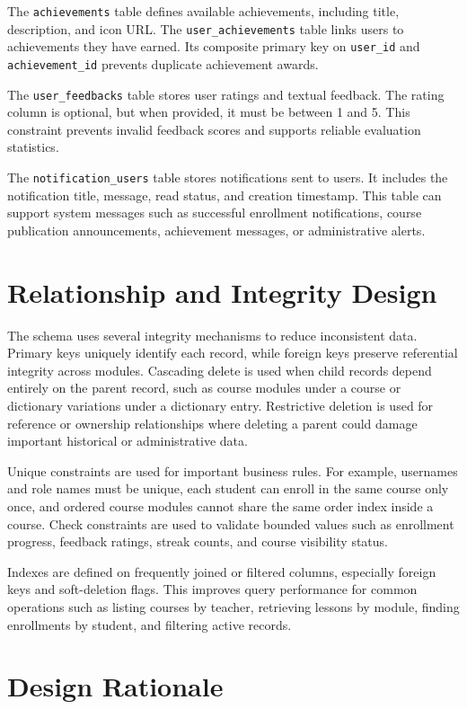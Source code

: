 The \texttt{achievements} table defines available achievements, including title, description, and icon URL. The \texttt{user\_achievements} table links users to achievements they have earned. Its composite primary key on \texttt{user\_id} and \texttt{achievement\_id} prevents duplicate achievement awards.

The \texttt{user\_feedbacks} table stores user ratings and textual feedback. The rating column is optional, but when provided, it must be between 1 and 5. This constraint prevents invalid feedback scores and supports reliable evaluation statistics.

The \texttt{notification\_users} table stores notifications sent to users. It includes the notification title, message, read status, and creation timestamp. This table can support system messages such as successful enrollment notifications, course publication announcements, achievement messages, or administrative alerts.

\section{Relationship and Integrity Design}

The schema uses several integrity mechanisms to reduce inconsistent data. Primary keys uniquely identify each record, while foreign keys preserve referential integrity across modules. Cascading delete is used when child records depend entirely on the parent record, such as course modules under a course or dictionary variations under a dictionary entry. Restrictive deletion is used for reference or ownership relationships where deleting a parent could damage important historical or administrative data.

Unique constraints are used for important business rules. For example, usernames and role names must be unique, each student can enroll in the same course only once, and ordered course modules cannot share the same order index inside a course. Check constraints are used to validate bounded values such as enrollment progress, feedback ratings, streak counts, and course visibility status.

Indexes are defined on frequently joined or filtered columns, especially foreign keys and soft-deletion flags. This improves query performance for common operations such as listing courses by teacher, retrieving lessons by module, finding enrollments by student, and filtering active records.

\section{Design Rationale}

